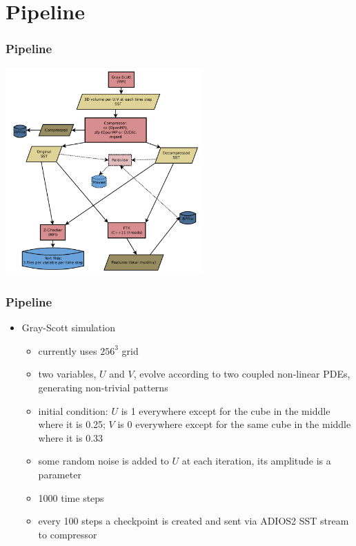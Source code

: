 \section{Pipeline}

\begin{frame}[fragile]
  \frametitle{Pipeline}
\begin{center}
 \includegraphics[width=7.6cm]{graphs/pipeline.png}
\end{center}
\end{frame}


\begin{frame}[fragile]
  \frametitle{Pipeline}
  \begin{itemize}
  \item Gray-Scott simulation
    \begin{itemize}
    \item currently uses $256^3$ grid
    \item two variables, $U$ and $V$, evolve according to two coupled non-linear PDEs, generating non-trivial patterns
    \item initial condition: $U$ is 1 everywhere except for the cube in the middle where it is 0.25; $V$ is 0 everywhere except for the
      same cube in the middle where it is 0.33
    \item some random noise is added to $U$ at each iteration, its amplitude is a parameter
    \item 1000 time steps
    \item every 100 steps a checkpoint is created and sent via ADIOS2 SST stream to compressor
    \end{itemize}
  \end{itemize}
\end{frame}

